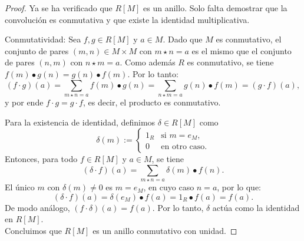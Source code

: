 \begin{proof}
	Ya se ha verificado que \( R[M] \) es un anillo. Solo falta demostrar que la convolución es conmutativa y que existe la identidad multiplicativa.
	
	\medskip
	
	\noindent Conmutatividad: Sea \( f, g \in R[M] \) y \( a \in M \). 	Dado que \( M \) es conmutativo, el conjunto de pares \( (m,n) \in M \times M \) con \( m \star n = a \) es el mismo que el conjunto de pares \( (n,m) \) con \( n \star m = a \). Como además \( R \) es conmutativo, se tiene \( f(m) \bullet g(n) = g(n) \bullet f(m) \). Por lo tanto:
	\[
	(f \cdot g)(a) = \sum_{m \star n = a} f(m) \bullet g(n) = \sum_{n \star m = a} g(n) \bullet f(m) = (g \cdot f)(a),
	\]
	y por ende \( f \cdot g = g \cdot f \), es decir, el producto es conmutativo.\\
	
	\medskip
	
	\noindent Para la existencia de identidad, definimos \( \delta \in R[M] \) como
	\[
	\delta(m) := 
	\begin{cases}
		1_R & \text{si } m = e_M, \\[4pt]
		0   & \text{en otro caso}.
	\end{cases}
	\]
	Entonces, para todo \( f \in R[M] \) y \( a \in M \), se tiene
	\[
	(\delta \cdot f)(a) = \sum_{m \star n = a} \delta(m) \bullet f(n).
	\]
	El único \( m \) con \( \delta(m) \ne 0 \) es \( m = e_M \), en cuyo caso \( n = a \), por lo que:
	\[
	(\delta \cdot f)(a) = \delta(e_M) \bullet f(a) = 1_R \bullet f(a) = f(a).
	\]
	De modo análogo, \( (f \cdot \delta)(a) = f(a) \). Por lo tanto, \( \delta \) actúa como la identidad en \( R[M] \).\\
	

	
	\noindent Concluimos que \( R[M] \) es un anillo conmutativo con unidad.
\end{proof}


